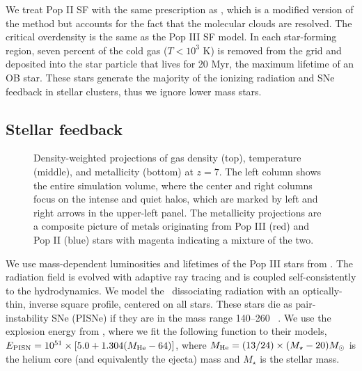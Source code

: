 \documentclass{PoS}
\begin{document}
%

We treat Pop II SF with the same prescription as \citet{Wise09}, which
is a modified version of the \citet{Cen92} method but accounts for the
fact that the molecular clouds are resolved.  The critical overdensity
is the same as the Pop III SF model.  In each star-forming region,
seven percent of the cold gas ($T < 10^3$ K) is removed from the grid
and deposited into the star particle that lives for 20 Myr, the
maximum lifetime of an OB star.  These stars generate the majority of
the ionizing radiation and SNe feedback in stellar clusters, thus we
ignore lower mass stars.

\subsection{Stellar feedback}

\begin{figure*}
\caption{\label{fig:projections} Density-weighted projections of gas
  density (top), temperature (middle), and metallicity (bottom) at
  $z=7$.  The left column shows the entire simulation volume, where
  the center and right columns focus on the intense and quiet halos,
  which are marked by left and right arrows in the upper-left panel.
  The metallicity projections are a composite picture of metals
  originating from Pop III (red) and Pop II (blue) stars with magenta
  indicating a mixture of the two.}
\end{figure*}

We use mass-dependent luminosities and lifetimes of the Pop III stars
from \citet{Schaerer02}.  The radiation field is evolved with adaptive
ray tracing \citep{Abel02_RT, Wise10} and is coupled self-consistently
to the hydrodynamics.  We model the \hh~dissociating radiation with an
optically-thin, inverse square profile, centered on all stars.  These
stars die as pair-instability SNe (PISNe) if they are in the mass
range 140--260 \Ms~\citep{Heger03}.  We use the explosion energy from
\citet{Heger02}, where we fit the following function to their models,
$E_{\rm PISN} = 10^{51} \times [5.0 + 1.304 (M_{\rm He} - 64)]$, where
$M_{\rm He} = (13/24) \times (M_\star - 20) \Ms$ is the helium core
(and equivalently the ejecta) mass and $M_\star$ is the stellar mass.
\end{document}
